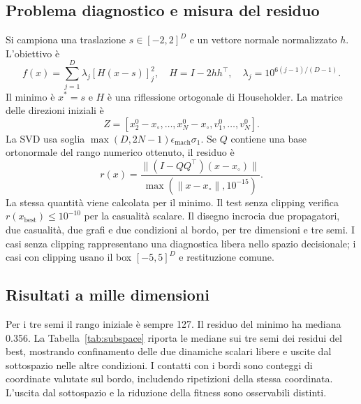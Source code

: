 \subsection{Problema diagnostico e misura del residuo}
Si campiona una traslazione $s\in[-2,2]^D$ e un vettore normale normalizzato $h$. L'obiettivo è
\begin{equation}
 f(x)=\sum_{j=1}^D\lambda_j[H(x-s)]_j^2,\quad
 H=I-2hh^\top,\quad \lambda_j=10^{6(j-1)/(D-1)}.
\end{equation}
Il minimo è $x^*=s$ e $H$ è una riflessione ortogonale di Householder. La matrice delle direzioni iniziali è
\begin{equation}
 Z=[x_2^0-x_\circ,\ldots,x_N^0-x_\circ,v_1^0,\ldots,v_N^0].
\end{equation}
La SVD usa soglia $\max(D,2N-1)\epsilon_{\mathrm{mach}}\sigma_1$. Se $Q$ contiene una base ortonormale del rango numerico ottenuto, il residuo è
\begin{equation}
 r(x)=\frac{\|(I-QQ^\top)(x-x_\circ)\|}{\max(\|x-x_\circ\|,10^{-15})}.
\end{equation}
La stessa quantità viene calcolata per il minimo. Il test senza clipping verifica $r(x_{\mathrm{best}})\le10^{-10}$ per la casualità scalare. Il disegno incrocia due propagatori, due casualità, due grafi e due condizioni al bordo, per tre dimensioni e tre semi. I casi senza clipping rappresentano una diagnostica libera nello spazio decisionale; i casi con clipping usano il box $[-5,5]^D$ e restituzione comune.

\subsection{Risultati a mille dimensioni}
Per i tre semi il rango iniziale è sempre 127. Il residuo del minimo ha mediana 0.356. La Tabella~\ref{tab:subspace} riporta le mediane sui tre semi dei residui del best, mostrando confinamento delle due dinamiche scalari libere e uscite dal sottospazio nelle altre condizioni. I contatti con i bordi sono conteggi di coordinate valutate sul bordo, includendo ripetizioni della stessa coordinata. L'uscita dal sottospazio e la riduzione della fitness sono osservabili distinti.

